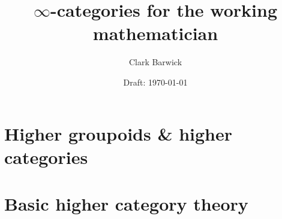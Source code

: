 \documentclass{cambridge7A}
\begin{document}

\author{Clark Barwick}
\title{$\infty$-categories for the working mathematician}
\date{Draft: \today}
\subtitle{}
\maketitle

\frontmatter

%
%
%
%

\setcounter{tocdepth}{2}
\tableofcontents

%

\mainmatter


%


\part{Higher groupoids \& higher categories}

\noindent 




\part{Basic higher category theory}

\noindent 

\backmatter




%
%

\end{document}
